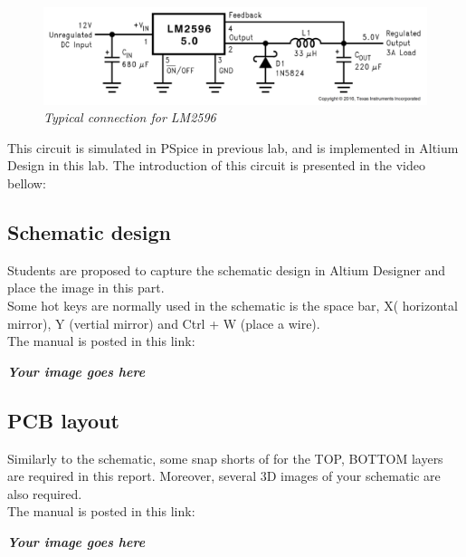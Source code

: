 \begin{figure}[!htp]
    \centering
    \includegraphics[width=5in]{source/picture/bai_4/LM2596.PNG}
    \caption{\textit{Typical connection for LM2596}}
    \label{bai4_pic2}
\end{figure}

This circuit is simulated in PSpice in previous lab, and is implemented in Altium Design in this lab. The introduction of this circuit is presented in the video bellow:
\begin{center}
\end{center}

\subsection{Schematic design}
Students are proposed to capture the schematic design in Altium Designer and place the image in this part.\\

Some hot keys are normally used in the schematic is the space bar, X( horizontal mirror), Y (vertial mirror) and Ctrl + W (place a wire).\\

The manual is posted in this link:

\begin{center}
\end{center}


\textbf{\textit{Your image goes here}}

\subsection{PCB layout}
Similarly to the schematic, some snap shorts of for the TOP, BOTTOM layers are required in this report. Moreover, several 3D images of your schematic are also required.\\

The manual is posted in this link:\\

\begin{center}
\end{center}

\textbf{\textit{Your image goes here}}